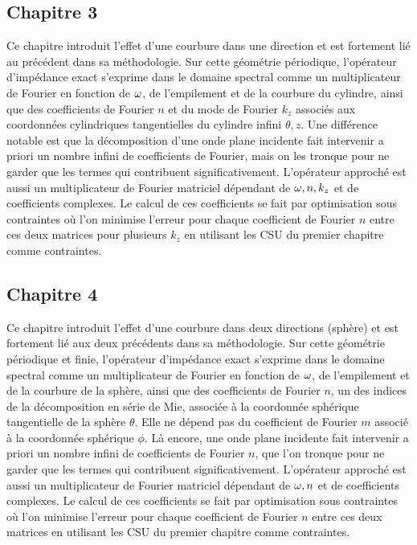 \subsection*{Chapitre 3}
Ce chapitre introduit l'effet d'une courbure dans une direction et est fortement lié au précédent dans sa méthodologie.
Sur cette géométrie périodique, l'opérateur d'impédance exact s'exprime dans le domaine spectral comme un multiplicateur de Fourier en fonction de \(\omega\), de l'empilement et de la courbure du cylindre, ainsi que des coefficients de Fourier \(n\) et du mode de Fourier \(k_z\) associés aux coordonnées cylindriques tangentielles du cylindre infini \(\theta,z\).
Une différence notable est que la décomposition d'une onde plane incidente fait intervenir a priori un nombre infini de coefficients de Fourier, mais on les tronque pour ne garder que les termes qui contribuent significativement.
L'opérateur approché est aussi un multiplicateur de Fourier matriciel dépendant de \(\omega, n, k_z\) et de coefficients complexes.
Le calcul de ces coefficients se fait par optimisation sous contraintes où l'on minimise l'erreur pour chaque coefficient de Fourier \(n\) entre ces deux matrices pour plusieurs \(k_z\) en utilisant les CSU du premier chapitre comme contraintes.

\subsection*{Chapitre 4}
Ce chapitre introduit l'effet d'une courbure dans deux directions (sphère) et est fortement lié aux deux précédents dans sa méthodologie.
Sur cette géométrie périodique et finie, l'opérateur d'impédance exact s'exprime dans le domaine spectral comme un multiplicateur de Fourier en fonction de \(\omega\), de l'empilement et de la courbure de la sphère, ainsi que des coefficients de Fourier \(n\), un des indices de la décomposition en série de Mie, associée à la coordonnée sphérique tangentielle de la sphère \(\theta\).
Elle ne dépend pas du coefficient de Fourier \(m\) associé à la coordonnée sphérique \(\phi\).
Là encore, une onde plane incidente fait intervenir a priori un nombre infini de coefficients de Fourier \(n\), que l'on tronque pour ne garder que les termes qui contribuent significativement.
L'opérateur approché est aussi un multiplicateur de Fourier matriciel dépendant de \(\omega, n\) et de coefficients complexes.
Le calcul de ces coefficients se fait par optimisation sous contraintes où l'on minimise l'erreur pour chaque coefficient de Fourier \(n\) entre ces deux matrices en utilisant les CSU du premier chapitre comme contraintes.

